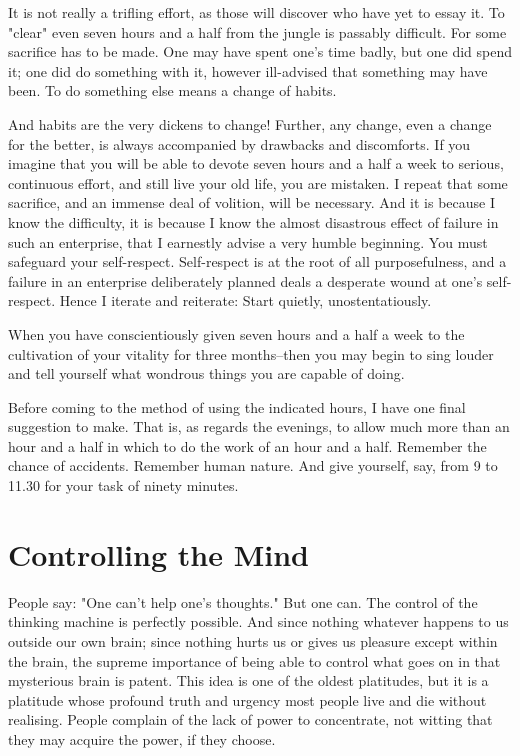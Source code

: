It is not really a trifling effort, as those will discover who have yet
to essay it.  To "clear" even seven hours and a half from the jungle is
passably difficult.  For some sacrifice has to be made. One may have
spent one's time badly, but one did spend it; one did do something with
it, however ill-advised that something may have been.  To do something
else means a change of habits.

And habits are the very dickens to change!  Further, any change, even a
change for the better, is always accompanied by drawbacks and
discomforts.  If you imagine that you will be able to devote seven
hours and a half a week to serious, continuous effort, and still live
your old life, you are mistaken.  I repeat that some sacrifice, and an
immense deal of volition, will be necessary.  And it is because I know
the difficulty, it is because I know the almost disastrous effect of
failure in such an enterprise, that I earnestly advise a very humble
beginning. You must safeguard your self-respect. Self-respect is at the
root of all purposefulness, and a failure in an enterprise deliberately
planned deals a desperate wound at one's self-respect.  Hence I iterate
and reiterate: Start quietly, unostentatiously.

When you have conscientiously given seven hours and a half a week to
the cultivation of your vitality for three months--then you may begin
to sing louder and tell yourself what wondrous things you are capable
of doing.

Before coming to the method of using the indicated hours, I have one
final suggestion to make.  That is, as regards the evenings, to allow
much more than an hour and a half in which to do the work of an hour
and a half.  Remember the chance of accidents.  Remember human nature.
And give yourself, say, from 9 to 11.30 for your task of ninety minutes.


\addtocounter{chapter}{1}\chapter*{Controlling the Mind}

People say:  "One can't help one's thoughts."  But one can.  The
control of the thinking machine is perfectly possible.  And since
nothing whatever happens to us outside our own brain; since nothing
hurts us or gives us pleasure except within the brain, the supreme
importance of being able to control what goes on in that mysterious
brain is patent.  This idea is one of the oldest platitudes, but it is
a platitude whose profound truth and urgency most people live and die
without realising.  People complain of the lack of power to
concentrate, not witting that they may acquire the power, if they
choose.

